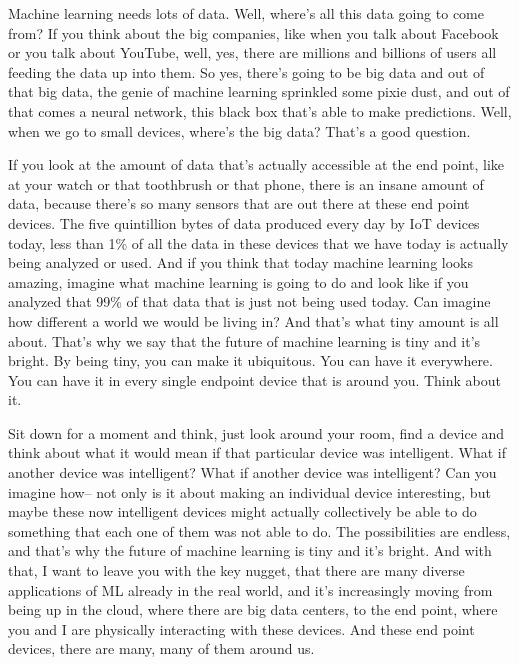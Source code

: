 Machine learning needs lots of data.
Well, where's all this data going to come from?
If you think about the big companies, like when you talk about Facebook or you talk about YouTube, well, yes, there are millions and billions of users all feeding the data up into them.
So yes, there's going to be big data and out of that big data, the genie of machine learning sprinkled some pixie dust, and out of that comes a neural network, this black box that's able to make predictions.
Well, when we go to small devices, where's the big data?
That's a good question.

If you look at the amount of data that's actually accessible at the end point, like at your watch or that toothbrush or that phone, there is an insane amount of data, because there's so many sensors that are out there at these end point devices.
The five quintillion bytes of data produced every day by IoT devices today, less than 1\% of all the data in these devices that we have today is actually being analyzed or used.
And if you think that today machine learning looks amazing, imagine what machine learning is going to do and look like if you analyzed that 99\% of that data that is just not being used today.
Can imagine how different a world we would be living in?
And that's what tiny amount is all about.
That's why we say that the future of machine learning is tiny and it's bright.
By being tiny, you can make it ubiquitous.
You can have it everywhere.
You can have it in every single endpoint device that is around you.
Think about it.


Sit down for a moment and think, just look around your room, find a device and think about what it would mean if that particular device was intelligent.
What if another device was intelligent?
What if another device was intelligent?
Can you imagine how-- not only is it about making an individual device interesting, but maybe these now intelligent devices might actually collectively be able to do something that each one of them was not able to do.
The possibilities are endless, and that's why the future of machine learning is tiny and it's bright.
And with that, I want to leave you with the key nugget, that there are many diverse applications of ML already in the real world, and it's increasingly moving from being up in the cloud, where there are big data centers, to the end point, where you and I are physically interacting with these devices.
And these end point devices, there are many, many of them around us.



